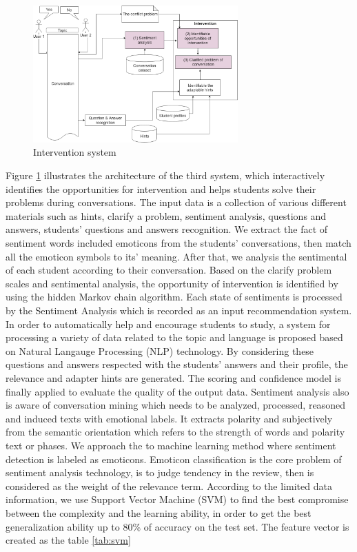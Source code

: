 \documentclass[letterpaper%
, twoside%
, 12pt%
,these%
, english%
,creativecommons,hyperref, withAlgo2e %
]{thETS}
\begin{document}
\begin{figure}
	\includegraphics[width=0.7\textwidth]{Figures/58.png}
	\caption{Intervention system}
	\label{intervention}
\end{figure}
Figure \ref{intervention} illustrates the architecture of the third system, which interactively identifies the opportunities for intervention and helps students solve their problems during conversations. The input data is a collection of various different materials such as hints, clarify a problem, sentiment analysis, questions and answers, students' questions and answers recognition.  We extract the fact of sentiment words included emoticons from the students' conversations, then match all the emoticon symbols to its' meaning. After that, we analysis the sentimental of each student according to their conversation. Based on the clarify problem scales and sentimental analysis, the opportunity of intervention is identified by using the hidden Markov chain algorithm. Each state of sentiments is processed by the Sentiment Analysis which is recorded as an input recommendation system. In order to automatically help and encourage students to study, a system for processing a variety of data related to the topic and language is proposed based on Natural Langauge Processing (NLP) technology.  By considering these questions and answers respected with the students’ answers and their profile, the relevance and adapter hints are generated. The scoring and confidence model is finally applied to evaluate the quality of the output data.  Sentiment  analysis also  is aware of conversation mining which needs to be analyzed,  processed, reasoned and induced texts with emotional labels. It extracts polarity and subjectively from the semantic orientation which refers to the strength of words and polarity text or phases. We approach the to machine learning method where sentiment detection is labeled as emoticons.  Emoticon classification is the core problem of sentiment analysis technology, is to judge tendency in the  review, then is considered as the weight of the relevance term. According to the limited data information, we use Support Vector Machine (SVM) \cite{Saif} to find the best compromise between the complexity and the learning ability, in order to get the best generalization ability up to 80\% of accuracy on the test set. The feature vector is created as the table \ref{tab:svm}
\end{document}
